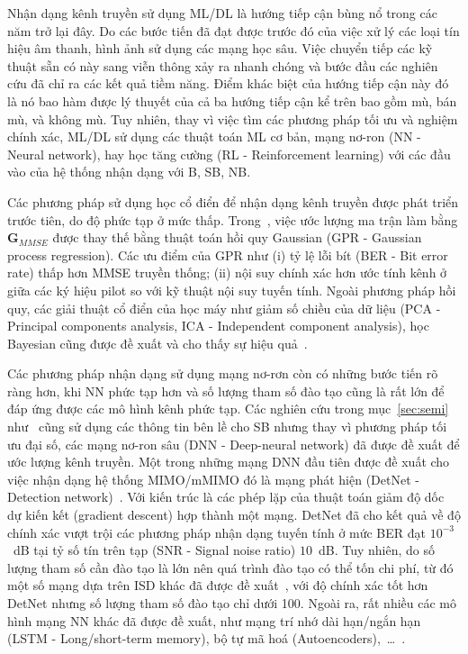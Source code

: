 Nhận dạng kênh truyền sử dụng ML/DL là hướng tiếp cận bùng nổ trong các năm trở lại đây. Do các bước tiến đã đạt được trước đó của việc xử lý các loại tín hiệu âm thanh, hình ảnh sử dụng các mạng học sâu. Việc chuyển tiếp các kỹ thuật sẵn có này sang viễn thông xảy ra nhanh chóng và bước đầu các nghiên cứu đã chỉ ra các kết quả tiềm năng. Điểm khác biệt của hướng tiếp cận này đó là nó bao hàm được lý thuyết của cả ba hướng tiếp cận kể trên bao gồm mù, bán mù, và không mù. Tuy nhiên, thay vì việc tìm các phương pháp tối ưu và nghiệm chính xác, ML/DL sử dụng các thuật toán ML cơ bản, mạng nơ-ron (NN - Neural network), hay học tăng cường (RL - Reinforcement learning) với các đầu vào của hệ thống nhận dạng với B, SB, NB.

Các phương pháp sử dụng học cổ điển để nhận dạng kênh truyền được phát triển trước tiên, do độ phức tạp ở mức thấp. Trong~\cite{Simeon2022}, việc ước lượng ma trận làm bằng $\mathbf{G}_{MMSE}$ được thay thế bằng thuật toán hồi quy Gaussian (GPR - Gaussian process regression). Các ưu điểm của GPR như (i) tỷ lệ lỗi bít (BER - Bit error rate) thấp hơn MMSE truyền thống; (ii) nội suy chính xác hơn ước tính kênh ở giữa các ký hiệu pilot so với kỹ thuật nội suy tuyến tính. Ngoài phương pháp hồi quy, các giải thuật cổ điển của học máy như giảm số chiều của dữ liệu (PCA - Principal components analysis, ICA - Independent component analysis), học Bayesian cũng được đề xuất và cho thấy sự hiệu quả~\cite{vilas2022}.

Các phương pháp nhận dạng sử dụng mạng nơ-rơn còn có những bước tiến rõ ràng hơn, khi NN phức tạp hơn và số lượng tham số đào tạo cũng là rất lớn để đáp ứng được các mô hình kênh phức tạp. Các nghiên cứu trong mục~\ref{sec:semi} như~\cite{Lin2020, Wan2008} cũng sử dụng các thông tin bên lề cho SB nhưng thay vì phương pháp tối ưu đại số, các mạng nơ-ron sâu (DNN - Deep-neural network) đã được đề xuất để ước lượng kênh truyền. Một trong những mạng DNN đầu tiên được đề xuất cho việc nhận dạng hệ thống MIMO/mMIMO đó là mạng phát hiện (DetNet - Detection network)~\cite{Samuel2019}. Với kiến trúc là các phép lặp của thuật toán giảm độ dốc dự kiến kết (gradient descent) hợp thành một mạng. DetNet đã cho kết quả về độ chính xác vượt trội các phương pháp nhận dạng tuyến tính ở mức BER đạt $10^{-3}$~dB tại tỷ số tín trên tạp (SNR - Signal noise ratio) $10$~dB. Tuy nhiên, do số lượng tham số cần đào tạo là lớn nên quá trình đào tạo có thể tốn chi phí, từ đó một số mạng dựa trên ISD khác đã được đề xuất~\cite{Mandloi2017, Liao2020}, với độ chính xác tốt hơn DetNet nhưng số lượng tham số đào tạo chỉ dưới 100. Ngoài ra, rất nhiều các mô hình mạng NN khác đã được đề xuất, như mạng trí nhớ dài hạn/ngắn hạn (LSTM - Long/short-term memory), bộ tự mã hoá (Autoencoders),~\ldots~\cite{vilas2022}.

